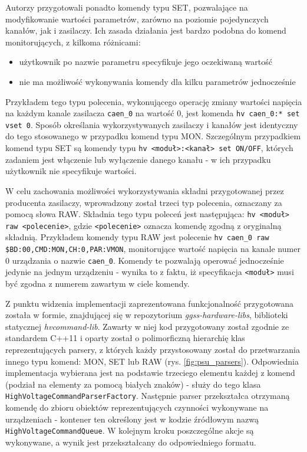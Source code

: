 Autorzy przygotowali ponadto komendy typu SET, pozwalające na modyfikowanie wartości parametrów, zarówno na poziomie pojedynczych kanałów, jak i zasilaczy. Ich zasada działania jest bardzo podobna do komend monitorujących, z kilkoma różnicami:
\begin{itemize}
    \item użytkownik po nazwie parametru specyfikuje jego oczekiwaną wartość
    \item nie ma możliwość wykonywania komendy dla kilku parametrów jednocześnie
\end{itemize}
Przykładem tego typu polecenia, wykonującego operację zmiany wartości napięcia na każdym kanale zasilacza \lstinline{caen_0} na wartość 0, jest komenda \lstinline{hv caen_0:* set vset 0}. Sposób określania wykorzystywanych zasilaczy i kanałów jest identyczny do tego stosowanego w przypadku komend typu MON. Szczególnym przypadkiem komend typu SET są komendy typu \lstinline{hv <moduł>:<kanał> set ON/OFF}, których zadaniem jest włączenie lub wyłączenie danego kanału - w ich przypadku użytkownik nie specyfikuje wartości.

W celu zachowania możliwości wykorzystywania składni przygotowanej przez producenta zasilaczy, wprowadzony został trzeci typ polecenia, oznaczany za pomocą słowa RAW. Składnia tego typu poleceń jest następująca: \lstinline{hv <moduł> raw <polecenie>}, gdzie \lstinline{<polecenie>} oznacza komendę zgodną z oryginalną składnią. Przykładem komendy typu RAW jest polecenie \lstinline{hv caen_0 raw $BD:00,CMD:MON,CH:0,PAR:VMON}, monitorujące wartość napięcia na kanale numer 0 urządzania o nazwie \lstinline{caen_0}. Komendy te pozwalają operować jednocześnie jedynie na jednym urządzeniu - wynika to z faktu, iż specyfikacja \lstinline{<moduł>} musi być zgodna z numerem zawartym w ciele komendy.

Z punktu widzenia implementacji zaprezentowana funkcjonalność przygotowana została w formie, znajdującej się w repozytorium \emph{ggss-hardware-libs}, biblioteki statycznej \emph{hvcommand-lib}. Zawarty w niej kod przygotowany został zgodnie ze standardem C++11 i oparty został o polimorficzną hierarchię klas reprezentujących parsery, z których każdy przystosowany został do przetwarzania innego typu komend: MON, SET lub RAW (rys. \ref{fig:psu_parsers}). Odpowiednia implementacja wybierana jest na podstawie trzeciego elementu każdej z komend (podział na elementy za pomocą białych znaków) - służy do tego klasa \lstinline{HighVoltageCommandParserFactory}. Następnie parser przekształca otrzymaną komendę do zbioru obiektów reprezentujących czynności wykonywane na urządzeniach - kontener ten określony jest w kodzie źródłowym nazwą \lstinline{HighVoltageCommandQueue}. W kolejnym kroku poszczególne akcje są wykonywane, a wynik jest przekształcany do odpowiedniego formatu.

